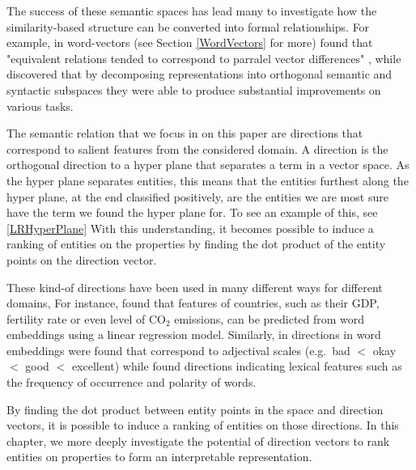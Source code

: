 The success of these semantic spaces has lead many to investigate how the similarity-based structure can be converted into formal relationships. For example, in word-vectors (see Section \ref{WordVectors} for more) \cite{TomasMikolovWen-tauYih2013} found that "equivalent relations tended to correspond to parralel vector differences" \cite{Mitchell2015}, while \cite{Mitchell2015} discovered that by decomposing representations into orthogonal semantic and syntactic subspaces they were able to produce substantial improvements on various tasks.  %

The semantic relation that we focus in on this paper are directions that correspond to salient features from the considered domain. %
A direction is the orthogonal direction to a hyper plane that separates a term in a vector space. As the hyper plane separates entities, this means that the entities furthest along the hyper plane, at the end classified positively, are the entities we are most sure have the term we found the hyper plane for. To see an example of this, see \ref {LRHyperPlane} With this understanding, it becomes possible to induce a ranking of entities on the properties by finding the dot product of the entity points on the direction vector. 

These kind-of directions have been used in many different ways for different domains, For instance,  \cite{gupta2015distributional} found that features of countries, such as their GDP, fertility rate or even level of CO$_2$ emissions, can be predicted from word embeddings using a linear regression model. Similarly, in \cite{kim2013deriving} directions in word embeddings were found that correspond to adjectival scales (e.g.\ bad $<$ okay $<$ good $<$ excellent) while \cite{DBLP:conf/acl/RotheS16} found directions indicating lexical features such as the frequency of occurrence and polarity of words. 

By finding the dot product between entity points in the space and direction vectors, it is possible to induce a ranking of entities on those directions. In this chapter, we more deeply investigate the potential of direction vectors to rank entities on properties to form an interpretable representation. 

